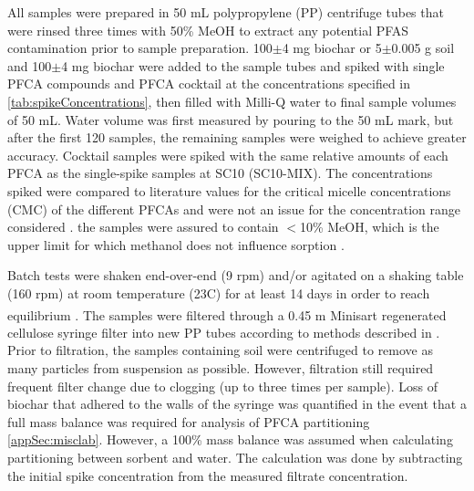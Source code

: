 All samples were prepared in 50 mL polypropylene (PP) centrifuge tubes that were rinsed three times with 50\% MeOH to extract any potential PFAS contamination prior to sample preparation. 100$\pm$4 mg biochar or 5$\pm$0.005 g soil and 100$\pm$4 mg biochar were added to the sample tubes and spiked with single PFCA compounds and PFCA cocktail at the concentrations specified in \cref{tab:spikeConcentrations}, then filled with Milli-Q water to final sample volumes of 50 mL. Water volume was first measured by pouring to the 50 mL mark, but after the first 120 samples, the remaining samples were weighed to achieve greater accuracy. Cocktail samples were spiked with the same relative amounts of each PFCA as the single-spike samples at SC10 (SC10-MIX). The concentrations spiked were compared to literature values for the critical micelle concentrations (CMC) of the different PFCAs and were not an issue for the concentration range considered \citep{bhhatarai2011,ding2013physicochemical}. the samples were assured to contain $<$10\% MeOH, which is the upper limit for which methanol does not influence sorption \citep{arvaniti2014}.

Batch tests were shaken end-over-end (9 rpm) and/or agitated on a shaking table (160 rpm) at room temperature (23\textdegree C) for at least 14 days in order to reach equilibrium \citep{higgins2006sorption}. The samples were filtered through a 0.45 \textmu m Minisart\textsuperscript{\textregistered} regenerated cellulose syringe filter into new \acrshort{PP} tubes according to methods described in \cite{Sorengard2019}. Prior to filtration, the samples containing soil were centrifuged to remove as many particles from suspension as possible. However, filtration still required frequent filter change due to clogging (up to three times per sample). Loss of biochar that adhered to the walls of the syringe was quantified in the event that a full mass balance was required for analysis of PFCA partitioning \cref{appSec:misclab}. However, a 100\% mass balance was assumed when calculating partitioning between sorbent and water. The calculation was done by subtracting the initial spike concentration from the measured filtrate concentration.

